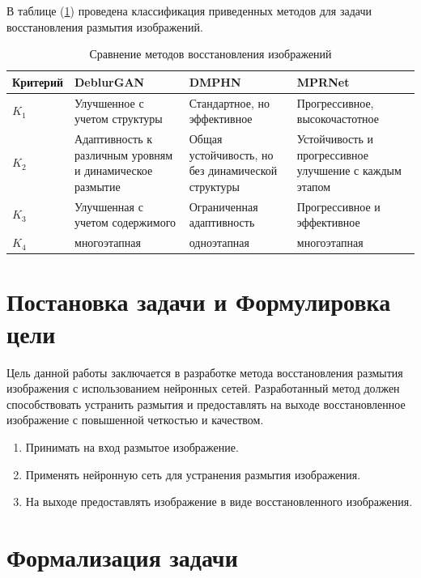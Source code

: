В таблице (\ref{tab:comparison}) проведена классификация приведенных методов для задачи восстановления размытия изображений.

\begin{table}[H]
    \centering
    \caption{Сравнение методов восстановления изображений}
    \label{tab:comparison}
    \begin{tabular}{|p{3cm}|p{3.5cm}|p{3.5cm}|p{3.7cm}|}
        \hline
        \textbf{Критерий} & \textbf{DeblurGAN} & \textbf{DMPHN} & \textbf{MPRNet} \\ \hline
        \(K_{1}\) & Улучшенное с учетом структуры & Стандартное, но эффективное & Прогрессивное, высокочастотное \\ \hline
        \(K_{2}\) & Адаптивность к различным уровням и динамическое размытие & Общая устойчивость, но без динамической структуры & Устойчивость и прогрессивное улучшение с каждым этапом \\ \hline
        \(K_{3}\) & Улучшенная с учетом содержимого & Ограниченная адаптивность & Прогрессивное и эффективное \\ \hline
        \(K_{4}\) & многоэтапная & одноэтапная & многоэтапная \\ \hline
    \end{tabular}
\end{table}


\section{Постановка задачи и Формулировка цели}

Цель данной работы заключается в разработке метода восстановления размытия изображения с использованием нейронных сетей. Разработанный метод должен способствовать устранить размытия и предоставлять на выходе восстановленное изображение с повышенной четкостью и качеством.
\begin{enumerate}
	\item Принимать на вход размытое изображение.
	\item Применять нейронную сеть для устранения размытия изображения.
	\item На выходе предоставлять изображение в виде восстановленного изображения.
\end{enumerate}

\section{Формализация задачи}

